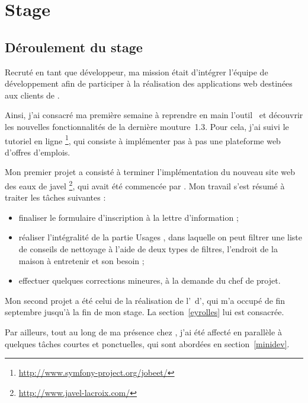 \chapter{Stage}

\section{Déroulement du stage}

Recruté en tant que développeur, ma mission était d'intégrer l'équipe de développement afin de participer à la réalisation des applications web destinées aux clients de \asl.

Ainsi, j'ai consacré ma première semaine à reprendre en main l'outil \asf\ et découvrir les nouvelles fonctionnalités de la dernière mouture~1.3. Pour cela, j'ai suivi le tutoriel en ligne \ajobeet\footnote{\url{http://www.symfony-project.org/jobeet/}}, qui consiste à implémenter pas à pas une plateforme web d'offres d'emplois.

Mon premier projet a consisté à terminer l'implémentation du nouveau site web des eaux de javel \alc\footnote{\url{http://www.javel-lacroix.com/}}, qui avait été commencée par \abriand. Mon travail s'est résumé à traiter les tâches suivantes :

\begin{itemize}
	\item finaliser le formulaire d'inscription à la lettre d'information ;
	\item réaliser l'intégralité de la partie \og Usages \fg, dans laquelle on peut filtrer une liste de conseils de nettoyage à l'aide de deux types de filtres, l'endroit de la maison à entretenir et son besoin ;
	\item effectuer quelques corrections mineures, à la demande du chef de projet.
\end{itemize}

Mon second projet a été celui de la réalisation de l'\aintranet\ d'\aey, qui m'a occupé de fin septembre jusqu'à la fin de mon stage. La section~\ref{eyrolles} lui est consacrée.

Par ailleurs, tout au long de ma présence chez \asl, j'ai été affecté en parallèle à quelques tâches courtes et ponctuelles, qui sont abordées en section~\ref{minidev}.









